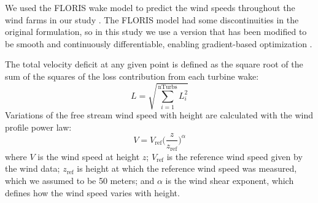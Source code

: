 We used the FLORIS wake model to predict the wind speeds throughout the wind farms in our study \citep{gebraad2016wind}. 
%
The FLORIS model had some discontinuities in the original formulation, so in this study we use a version that has been modified to be smooth and continuously differentiable, enabling gradient-based optimization \citep{thomas2017improving}.


The total velocity deficit at any given point is defined as the square root of the sum of the squares of the loss contribution from each turbine wake:
\begin{equation}
L = \sqrt{\sum_{i=1}^\text{nTurbs}L_i^2}
\end{equation}
\noindent Variations of the free stream wind speed with height are calculated with the wind profile power law: 
\begin{equation}
V = V_{\text{ref}}\Big(\frac{z}{z_{\text{ref}}}\Big)^\alpha
\label{Eq:shear}
\end{equation}
where $V$ is the wind speed at height $z$; $V_{\text{ref}}$ is the reference wind speed given by the wind data; $z_{\text{ref}}$ is height at which the reference wind speed was measured, which we assumed to be 50 meters;  and $\alpha$ is the wind shear exponent, which defines how the wind speed varies with height.